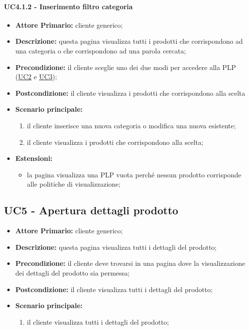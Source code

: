 \paragraph{UC4.1.2 - Inserimento filtro categoria}
\label{UC4.1.2}
\begin{itemize}
    \item \textbf{Attore Primario:} cliente generico;
    \item \textbf{Descrizione:} questa pagina visualizza tutti i prodotti che corrispondono ad una categoria o che corrispondono ad una parola cercata;
    \item \textbf{Precondizione:} il cliente sceglie uno dei due modi per accedere alla PLP (\hyperref[UC2]{UC2} e \hyperref[UC3]{UC3});
    \item \textbf{Postcondizione:} il cliente visualizza i prodotti che corrispondono alla scelta
    \item \textbf{Scenario principale:}
    \begin{enumerate}
        \item il cliente inserisce una nuova categoria o modifica una nuova esistente;
        \item il cliente visualizza i prodotti che corrispondono alla scelta;
    \end{enumerate}
    \item \textbf{Estensioni:}
    \begin{itemize}
        \item la pagina visualizza una PLP vuota perché nessun prodotto corrisponde alle politiche di visualizzazione;
    \end{itemize}
\end{itemize}

\subsection{UC5 - Apertura dettagli prodotto}
\label{UC5}
\begin{itemize}
    \item \textbf{Attore Primario:} cliente generico;
    \item \textbf{Descrizione:} questa pagina visualizza tutti i dettagli del prodotto;
    \item \textbf{Precondizione:} il cliente deve trovarsi in una pagina dove la visualizzazione dei dettagli del prodotto sia permessa;
    \item \textbf{Postcondizione:} il cliente visualizza tutti i dettagli del prodotto;
    \item \textbf{Scenario principale:}
    \begin{enumerate}
        \item il cliente visualizza tutti i dettagli del prodotto;
    \end{enumerate}
\end{itemize}

